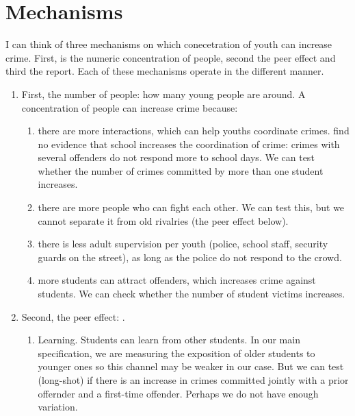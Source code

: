 \documentclass[11pt]{article}
\begin{document}
 \section{Mechanisms}

I can think of three mechanisms on which conecetration of youth can increase crime. First, is the numeric concentration of people, second the peer effect and 
third the report. Each of these mechanisms operate in the different manner. 
\begin{enumerate}
      \item[A.] First, the number of people: how many young people are around.
            A concentration of people can increase crime because:
      \begin{enumerate}
            \item there are more interactions, which can help youths
                  coordinate crimes. \citet{jacob2003} find no evidence that
                  school increases the coordination of crime: crimes with
                  several offenders do not respond more to school days. We can
                  test whether the number of crimes committed by more than one
                  student increases.
            \item there are more people who can fight each other. We can test
                  this, but we cannot separate it from old rivalries (the peer
                  effect below).
            \item there is less adult supervision per youth (police, school
                  staff, security guards on the street), as long as the police
                  do not respond to the crowd.
            \item more students can attract offenders, which increases crime
                  against students. We can check whether the number of student
                  victims increases.
      \end{enumerate}
      \item[B.] Second, the peer effect: .
      \begin{enumerate}
            \item Learning. Students can learn from other students.
                  In our main specification, we are measuring the exposition of older students to
                  younger ones so this channel may be weaker in our case. But we can test (long-shot) if there is an increase in crimes
                   committed jointly with a prior offernder and a first-time offender.  Perhaps we do not have enough variation. 

\end{enumerate}
\end{enumerate}
\end{document}
